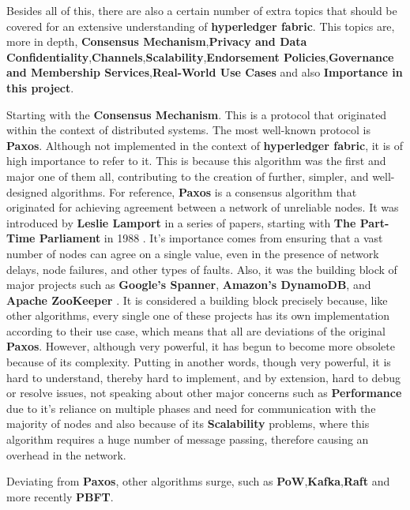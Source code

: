 Besides all of this, there are also a certain number of extra topics that should be covered for an extensive understanding of \textbf{hyperledger fabric}. This topics are, more in depth, \textbf{Consensus Mechanism},\textbf{Privacy and Data Confidentiality},\textbf{Channels},\textbf{Scalability},\textbf{Endorsement Policies},\textbf{Governance and Membership Services},\textbf{Real-World Use Cases} and also \textbf{Importance in this project}.

Starting with the \textbf{Consensus Mechanism}. This is a protocol that originated within the context of distributed systems. The most well-known protocol is \textbf{Paxos}. Although not implemented in the context of \textbf{hyperledger fabric}, it is of high importance to refer to it. This is because this algorithm was the first and major one of them all, contributing to the creation of further, simpler, and well-designed algorithms. For reference, \textbf{Paxos} is a consensus algorithm that originated for achieving agreement between a network of unreliable nodes. It was introduced by \textbf{Leslie Lamport} in a series of papers, starting with \textbf{The Part-Time Parliament} in 1988 \cite{paxos-main} \cite{paxos-simple}. It's importance comes from ensuring that a vast number of nodes can agree on a single value, even in the presence of network delays, node failures, and other types of faults. Also, it was the building block of major projects such as \textbf{Google's Spanner}, \textbf{Amazon's DynamoDB}, and \textbf{Apache ZooKeeper} \cite{google-spanner} \cite{zookeeper} \cite{dynamodb}. It is considered a building block precisely because, like other algorithms, every single one of these projects has its own implementation according to their use case, which means that all are deviations of the original \textbf{Paxos}. However, although very powerful, it has begun to become more obsolete because of its complexity. Putting in another words, though very powerful, it is hard to understand, thereby hard to implement, and by extension, hard to debug or resolve issues, not speaking about other major concerns such as \textbf{Performance} due to it's reliance on multiple phases and need for communication with the majority of nodes and also because of its \textbf{Scalability} problems, where this algorithm requires a huge number of message passing, therefore causing an overhead in the network.

Deviating from \textbf{Paxos}, other algorithms surge, such as \textbf{PoW},\textbf{Kafka},\textbf{Raft} and more recently \textbf{PBFT}.

